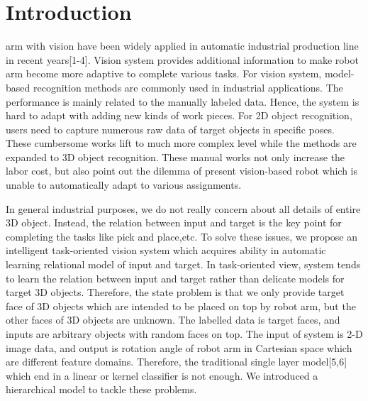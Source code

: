 \documentclass[journal]{IEEEtran}
\begin{document}
%
\IEEEpeerreviewmaketitle



\section{Introduction}


% 
% 
% 
% 
 arm with vision have been widely applied in automatic industrial production line in recent years[1-4]. Vision system provides additional information to make robot arm become more adaptive to complete various tasks. For vision system, model-based recognition methods are commonly used in industrial applications. The performance is mainly related to the manually labeled data. Hence, the system is hard to adapt with adding new kinds of work pieces. For 2D object recognition, users need to capture numerous raw data of target objects in specific poses. These cumbersome works lift to much more complex level while the methods are expanded to 3D object recognition. These manual works not only increase the labor cost, but also point out the dilemma of present vision-based robot which is unable to automatically adapt to various assignments. 

In general industrial purposes, we do not really concern about all details of entire 3D object. Instead, the relation between input and target is the key point for completing the tasks like pick and place,etc. To solve these issues, we propose an intelligent task-oriented vision system which acquires ability in automatic learning relational model of input and target. In task-oriented view, system tends to learn the relation between input and target rather than delicate models for target 3D objects. Therefore, the state problem is that we only provide target face of 3D objects which are intended to be placed on top by robot arm, but the other faces of 3D objects are unknown. The labelled data is target faces, and inputs are arbitrary objects with random faces on top. The input of system is 2-D image data, and output is rotation angle of robot arm in Cartesian space which are different feature domains. Therefore, the traditional single layer model[5,6] which end in a linear or kernel classifier is not enough. We introduced a hierarchical model to tackle these problems. 
\end{document}

